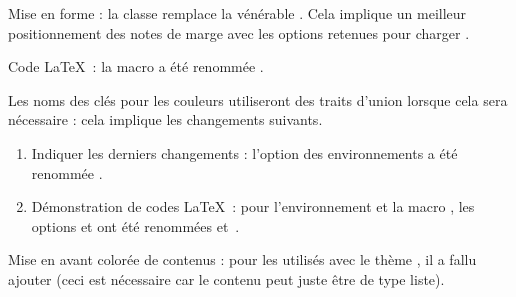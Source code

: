 \begin{tdocbreak}[version = 1.7.0, date = 2024-12-04]
	\item Mise en forme : la classe  remplace la vénérable . Cela implique un meilleur positionnement des notes de marge avec les options retenues pour charger .

	\item Code \LaTeX\ : la macro  a été renommée .

	\item Les noms des clés pour les couleurs utiliseront des traits d'union lorsque cela sera nécessaire : cela implique les changements suivants.
	\begin{enumerate}
		\item Indiquer les derniers changements : l'option  des environnements a été renommée .

		\item Démonstration de codes \LaTeX\ : pour l'environnement  et la macro , les options  et  ont été renommées  et \,.
	\end{enumerate}
\end{tdocbreak}


\begin{tdocfix}
	\item Mise en avant colorée de contenus : pour les  utilisés avec le thème , il a fallu ajouter  (ceci est nécessaire car le contenu peut juste être de type liste).
\end{tdocfix}


